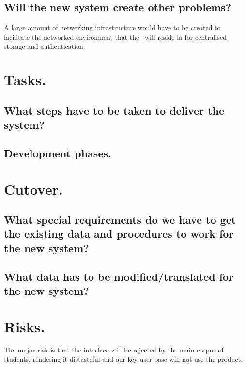 \subsection{Will the new system create other problems?}

A large amount of networking infrastructure would have to be created to facilitate the networked environment that the \iDesk\ will reside in for centralised storage and authentication.

\section{Tasks.}

\subsection{What steps have to be taken to deliver the system?}

\NA

\subsection{Development phases.}

\NA

\section{Cutover.}

\subsection{What special requirements do we have to get the existing data and procedures to work for the new system?}

\NA

\subsection{What data has to be modified/translated for the new system?}

\NA

\section{Risks.}

The major risk is that the interface will be rejected by the main corpus of students, rendering it distasteful and our key user base will not use the product.

